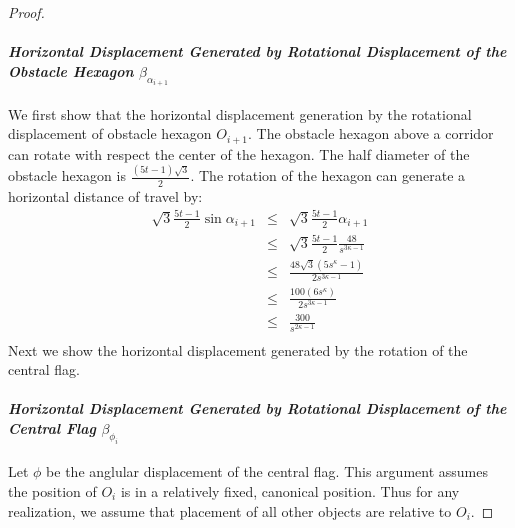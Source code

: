 \documentclass[10pt]{CSUNthesis}
\theoremstyle{plain}%
\theoremstyle{definition}
\theoremstyle{remark}
\newcommand{\lr}[1]{\left( #1 \right)}
\begin{document}
\begin{proof}
\paragraph{\textit{Horizontal Displacement Generated by Rotational Displacement of the Obstacle Hexagon} $\beta_{\alpha_{i+1}}$}
We first show that the horizontal displacement generation by the rotational displacement of obstacle hexagon $O_{i+1}$.  
The obstacle hexagon above a corridor can rotate with respect the center of the hexagon.  
The half diameter of the obstacle hexagon is $ \frac{(5t-1)\sqrt{3}}{2}$.  
The rotation of the hexagon can generate a horizontal distance of travel by:
\begin{equation}
\begin{array}{rcl}
\sqrt{3} \frac{5t-1}{2} \sin \alpha_{i+1} &\leq&\sqrt{3} \frac{5t-1}{2}  \alpha_{i+1} \\
&\leq& \sqrt{3} \frac{5t-1}{2}  \frac{48}{s^{3\kappa-1}}\\
&\leq& \frac{48 \sqrt{3} \lr{5s^\kappa - 1}}{2s^{3\kappa-1}}\\
&\leq& \frac{100 \lr{6s^\kappa}}{2s^{3\kappa-1}}\\
&\leq& \frac{300}{s^{2\kappa-1}}\\
\end{array}
\end{equation}
Next we show the horizontal displacement generated by the rotation of the central flag.
\paragraph{\textit{Horizontal Displacement Generated by Rotational Displacement of the Central Flag} $\beta_{\phi_{i}}$}
Let $\phi$ be the anglular displacement of the central flag.  
This argument assumes the position of $O_i$ is in a relatively fixed, canonical position.  
Thus for any realization, we assume that placement of all other objects are relative to $O_i$.  


\end{proof}
\end{document}
